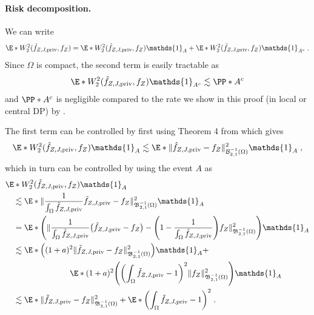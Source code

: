 \documentclass{article}
\newcommand{\1}{\mathds{1}}
\DeclarePairedDelimiter{\paren}{\lparen}{\rparen}
\theoremstyle{plain}
\theoremstyle{definition}
\theoremstyle{remark}
\begin{document}
\paragraph{Risk decomposition.}

We can write 
\begin{equation}
    \begin{aligned}
        \E*{W_2^2(\hat{f}_{Z, J, \textrm{priv} }, {f}_{Z})}
        =
        \E*{W_2^2(\hat{f}_{Z, J, \textrm{priv} }, {f}_{Z}) \1_{A}}
        +
        \E*{W_2^2(\hat{f}_{Z, J, \textrm{priv} }, {f}_{Z}) \1_{A^c}} \;.
    \end{aligned}
\end{equation}
Since $\Omega$ is compact, the second term is easily tractable as 
\begin{equation}
    \E*{W_2^2(\hat{f}_{Z, J, \textrm{priv} }, {f}_{Z}) \1_{A^c}}
    \lesssim
    \PP*{A^c} 
\end{equation}
and  $  \PP*{A^c} $ is negligible compared to the rate we show in this proof  (in local or central DP) by .


The first term can be controlled by first using Theorem 4 from \cite{NilesWeed2019Minimax} which gives
\begin{equation}
    \E*{W_2^2(\hat{f}_{Z, J, \textrm{priv} }, {f}_{Z}) \1_{A}}
    \lesssim
    \E*{\| \hat{f}_{Z, J, \textrm{priv} } - f_Z\|_{{\mathcal{B}}_{2, 1}^{-1}(\Omega)}^2 \1_{A}}\;,
\end{equation}
which in turn can be controlled by using the event $A$ as
\begin{equation}
\begin{aligned}
    &\E*{W_2^2(\hat{f}_{Z, J, \textrm{priv} }, {f}_{Z}) \1_{A}} \\
    & \quad\lesssim
    \E*{\| \frac{1}{\int_{\Omega} \tilde{f}_{Z, J, \textrm{priv} }} \tilde{f}_{Z, J, \textrm{priv} } - f_Z\|_{{\mathfrak{B}}_{2, 1}^{-1}(\Omega)}^2 \1_{A}} \\
    &\quad=
    \E*{\paren*{\| \frac{1}{\int_{\Omega}  \tilde{f}_{Z, J, \textrm{priv} }} \paren*{\tilde{f}_{Z, J, \textrm{priv} } - f_Z} - \paren*{1- \frac{1}{\int_{\Omega} \tilde{f}_{Z, J, \textrm{priv} }} }  f_Z \|_{{\mathfrak{B}}_{2, 1}^{-1}(\Omega)}^2 }\1_{A}} \\
    &\quad\lesssim
    \E*{ \paren*{(1 + a)^2 \|\tilde{f}_{Z, J, \textrm{priv} } -  f_Z \|_{{\mathfrak{B}}_{2, 1}^{-1}(\Omega)}^2} \1_{A}} + \\  &\qquad\qquad\qquad\qquad \E*{ (1+a)^2 \paren*{ \paren*{\int_{\Omega} \tilde{f}_{Z, J, \textrm{priv} } - 1}^2 \|f_Z\|_{{\mathfrak{B}}_{2, 1}^{-1}(\Omega)}^2 }\1_{A}} \\
    &\quad\lesssim
    \E*{ \|\tilde{f}_{Z, J, \textrm{priv} } -  f_Z \|_{{\mathfrak{B}}_{2, 1}^{-1}(\Omega)}^2}
    +
    \E*{ \paren*{\int_{\Omega} \tilde{f}_{Z, J, \textrm{priv} } - 1}^2}
    \;.
\end{aligned}
\end{equation}
\end{document}
